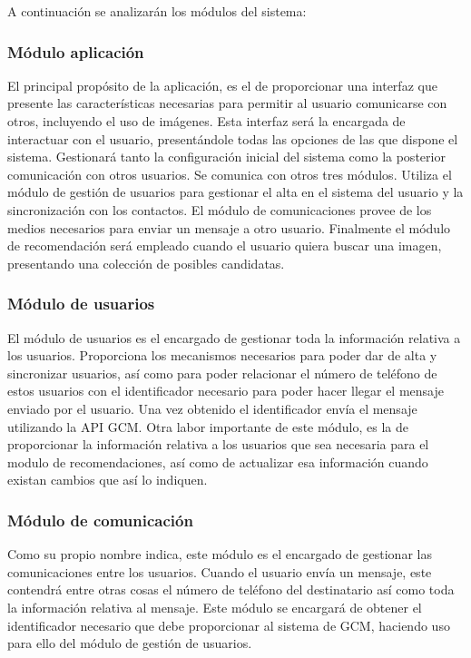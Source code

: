 A continuación se analizarán los módulos del sistema:


\subsubsection{Módulo aplicación}
El principal propósito de la aplicación, es el de proporcionar una interfaz que presente las características necesarias para permitir al usuario comunicarse con otros, incluyendo el uso de imágenes. Esta interfaz será la encargada de interactuar con el usuario, presentándole todas las opciones de las que dispone el sistema. Gestionará tanto la configuración inicial del sistema como la posterior comunicación con otros usuarios. Se comunica con otros tres módulos. Utiliza el módulo de gestión de usuarios para gestionar el alta en el sistema del usuario y la sincronización con los contactos. El módulo de comunicaciones provee de los medios necesarios para enviar un mensaje a otro usuario. Finalmente el módulo de recomendación será empleado cuando el usuario quiera buscar una imagen, presentando una colección de posibles candidatas.


\subsubsection{Módulo de usuarios}
El módulo de usuarios es el encargado de gestionar toda la información relativa a los usuarios. Proporciona los mecanismos necesarios para poder dar de alta y sincronizar usuarios, así como para poder relacionar el número de teléfono de estos usuarios con el identificador necesario para poder hacer llegar el mensaje enviado por el usuario. Una vez obtenido el identificador envía el mensaje utilizando la \acs{API} \acs{GCM}. Otra labor importante de este módulo, es la de proporcionar la información relativa a los usuarios que sea necesaria para el modulo de recomendaciones, así como de actualizar esa información cuando existan cambios que así lo indiquen. 

\subsubsection{Módulo de comunicación}
Como su propio nombre indica, este módulo es el encargado de gestionar las comunicaciones entre los usuarios. Cuando el usuario envía un mensaje, este contendrá entre otras cosas el número de teléfono del destinatario así como toda la información relativa al mensaje. Este módulo se encargará de obtener el identificador necesario que debe proporcionar al sistema de \ac{GCM}, haciendo uso para ello del módulo de gestión de usuarios.


